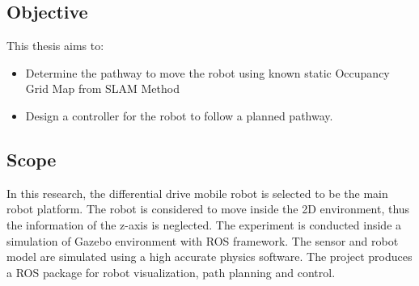 \subsection{Objective}
This thesis aims to:
\begin{itemize}
\item Determine the pathway to move the robot using known static Occupancy Grid Map from SLAM Method
\item Design a controller for the robot to follow a planned pathway.
\end{itemize}\par




\subsection{Scope}
\hspace{1.27cm}
In this research, the differential drive mobile robot is selected to be the main robot platform. The robot is considered to move inside the 2D environment, thus the information of the z-axis is neglected. The experiment is conducted inside a simulation of Gazebo environment with ROS framework. The sensor and robot model are simulated using a high accurate physics software. The project produces a ROS package for robot visualization, path planning and control.\par
